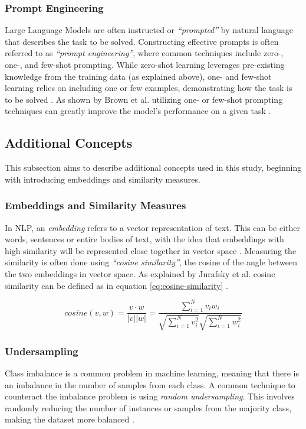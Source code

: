 \subsubsection{Prompt Engineering}

Large Language Models are often instructed or \textit{“prompted”} by natural language that describes the task to be solved. Constructing effective prompts is often referred to as \textit{“prompt engineering”}, where common techniques include zero-, one-, and few-shot prompting. While zero-shot learning leverages pre-existing knowledge from the training data (as explained above), one- and few-shot learning relies on including one or few examples, demonstrating how the task is to be solved \cite{brown2020language}. As shown by Brown et al. utilizing one- or few-shot prompting techniques can greatly improve the model's performance on a given task \cite{brown2020language}.

\subsection{Additional Concepts}

This subsection aims to describe additional concepts used in this study, beginning with introducing embeddings and similarity measures.

\subsubsection{Embeddings and Similarity Measures}

In NLP, an \textit{embedding} refers to a vector representation of text. This can be either words, sentences or entire bodies of text, with the idea that embeddings with high similarity will be represented close together in vector space \cite{Jurafsky2000SpeechAL}. Measuring the similarity is often done using \textit{“cosine similarity”}, the cosine of the angle between the two embeddings in vector space. As explained by Jurafsky et al. cosine similarity can be defined as in equation \ref{eq:cosine-similarity} \cite{Jurafsky2000SpeechAL}. 

\begin{equation}
\label{eq:cosine-similarity}
cosine(v,w) = \frac{v \cdot w}{|{v}||{w}|} = \frac{\sum_{i=1}^{N}v_iw_i}{\sqrt{\sum_{i=1}^{N}v_i^2}\sqrt{\sum_{i=1}^{N}w_i^2}}
\end{equation}

\subsubsection{Undersampling}

Class imbalance is a common problem in machine learning, meaning that there is an imbalance in the number of samples from each class. A common technique to counteract the imbalance problem is using \textit{random undersampling}. This involves randomly reducing the number of instances or samples from the majority class, making the dataset more balanced \cite{MohammedUndersampling}. 


